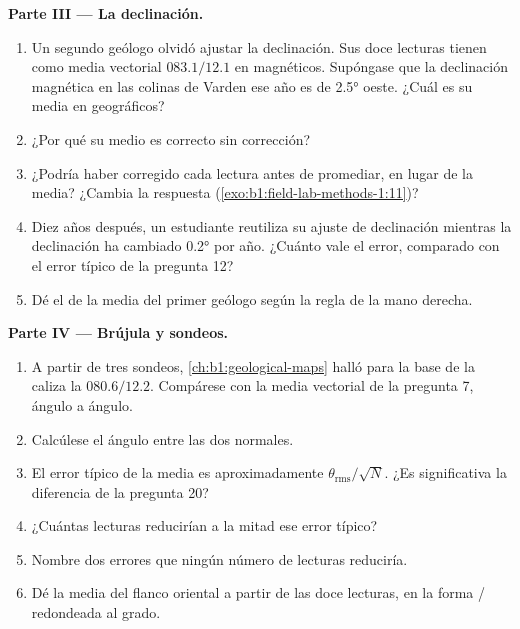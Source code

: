 \begin{problem}
\medskip
\noindent\textbf{Parte III --- La declinación.}
\begin{enumerate}[resume]
  \item Un segundo geólogo olvidó ajustar la declinación. Sus doce lecturas tienen como media vectorial
        $083.1/12.1$ en  magnéticos. Supóngase que la declinación magnética en las colinas de Varden ese
        año es de \ang{2.5} oeste. ¿Cuál es su media en  geográficos?
  \item ¿Por qué su  medio es correcto sin corrección?
  \item ¿Podría haber corregido cada lectura antes de promediar, en lugar de la media? ¿Cambia la respuesta
        (\cref{exo:b1:field-lab-methods-1:11})?
  \item Diez años después, un estudiante reutiliza su ajuste de declinación mientras la declinación ha
        cambiado \ang{0.2} por año. ¿Cuánto vale el error, comparado con el error típico de la pregunta 12?
  \item Dé el  de la  media del primer geólogo según la regla de la mano derecha.
\end{enumerate}

\medskip
\noindent\textbf{Parte IV --- Brújula y sondeos.}
\begin{enumerate}[resume]
  \item A partir de tres sondeos, \cref{ch:b1:geological-maps} halló para la base de la caliza la 
        $080.6/12.2$. Compárese con la media vectorial de la pregunta 7, ángulo a ángulo.
  \item Calcúlese el ángulo entre las dos normales.
  \item El error típico de la  media es aproximadamente $\theta_{\text{rms}}/\sqrt N$. ¿Es
        significativa la diferencia de la pregunta 20?
  \item ¿Cuántas lecturas reducirían a la mitad ese error típico?
  \item Nombre dos errores que ningún número de lecturas reduciría.
  \item Dé la  media del flanco oriental a partir de las doce lecturas, en la forma / redondeada al grado.
\end{enumerate}
\end{problem}
